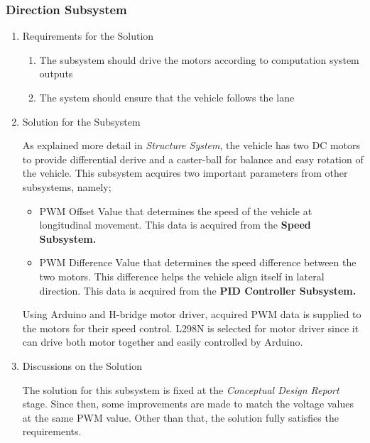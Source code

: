 \documentclass[a4paper,12pt]{article}
\begin{document}
\subsubsection{Direction Subsystem}
	\begin{enumerate}
		\item {Requirements for the Solution}
		
		\begin{enumerate}
			\item The subsystem should drive the motors according to computation system outputs
			\item The system should ensure that the vehicle follows the lane 	
		\end{enumerate}

		\item {Solution for the Subsystem}

		As explained more detail in \textit{Structure System}, the vehicle has two DC motors to provide differential derive and a caster-ball for balance and easy rotation of the vehicle.  This subsystem acquires two important parameters from other subsystems, namely;

		\begin{itemize}
			\item PWM Offset Value that determines the speed of the vehicle at longitudinal movement. This data is acquired from the \textbf{Speed Subsystem.} 	
			\item PWM Difference Value that determines the speed difference between the two motors. This difference helps the vehicle align itself in lateral direction. This data is acquired from the \textbf{PID Controller Subsystem.} 	
		\end{itemize}	
	
	Using Arduino and H-bridge motor driver, acquired PWM data is supplied to the motors for their speed control. L298N is selected for motor driver since it can drive both motor together and easily controlled by Arduino.


	\item {Discussions on the Solution}

		The solution for this subsystem is fixed at the \textit{Conceptual Design Report} stage. Since then, some improvements are made to match the voltage values at the same PWM value. Other than that, the solution fully satisfies the requirements.

	\end{enumerate}
\end{document}
